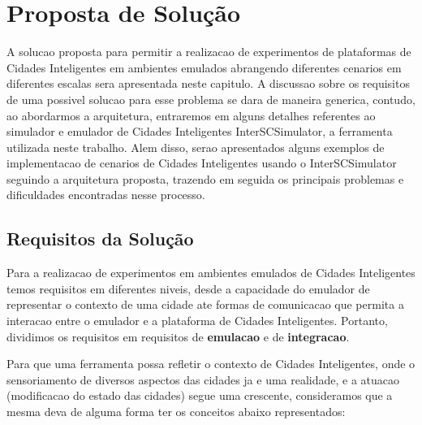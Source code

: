 \chapter{Proposta de Solução}
\label{cap:proposta}

A solucao proposta para permitir a realizacao de experimentos de plataformas de Cidades Inteligentes em ambientes emulados abrangendo diferentes cenarios em diferentes escalas sera
apresentada neste capitulo.
A discussao sobre os requisitos de uma possivel solucao para esse problema se dara de maneira generica, contudo, ao abordarmos a arquitetura, entraremos em alguns detalhes referentes ao
simulador e emulador de Cidades Inteligentes InterSCSimulator, a ferramenta utilizada neste trabalho.
Alem disso, serao apresentados alguns exemplos de implementacao de cenarios de Cidades Inteligentes usando o InterSCSimulator seguindo a arquitetura proposta, trazendo em seguida os
principais problemas e dificuldades encontradas nesse processo.

\section{Requisitos da Solução}

Para a realizacao de experimentos em ambientes emulados de Cidades Inteligentes temos requisitos em diferentes niveis, desde a capacidade do emulador de representar o contexto
de uma cidade ate formas de comunicacao que permita a interacao entre o emulador e a plataforma de Cidades Inteligentes.
Portanto, dividimos os requisitos em requisitos de \textbf{emulacao} e de \textbf{integracao}.

Para que uma ferramenta possa refletir o contexto de Cidades Inteligentes, onde o sensoriamento de diversos aspectos das cidades ja e uma realidade, e a atuacao (modificacao do estado
das cidades) segue uma crescente, consideramos que a mesma deva de alguma forma ter os conceitos abaixo representados:

